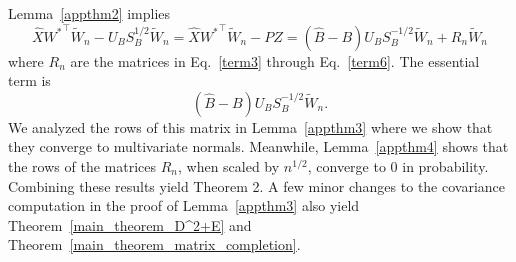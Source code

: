  Lemma~\ref{appthm2} implies
 $$\hat{X} {W^*}^{\top} \tilde{W}_n - U_B S_B^{1/2} \tilde{W}_n = \hat{X} {W^*}^{\top} \tilde{W}_n - PZ = (\hat{B} - B) U_B S_B^{-1/2} \tilde{W}_n + R_n \tilde{W}_n$$ where $R_n$ are the matrices in Eq.~\eqref{term3} through Eq.~\eqref{term6}. The essential term is $$(\hat{B} - B) U_B S_B^{-1/2} \tilde{W}_n.$$ We analyzed the rows of this matrix in Lemma~\ref{appthm3} where we show that they converge to multivariate normals. Meanwhile, Lemma~\ref{appthm4} shows that the rows of the matrices $R_n$, when scaled by $n^{1/2}$, converge to $0$ in probability. Combining these results yield Theorem 2. A few minor changes to the covariance computation in the proof of Lemma~\ref{appthm3} also yield Theorem~\ref{main_theorem_D^2+E} and Theorem~\ref{main_theorem_matrix_completion}.

